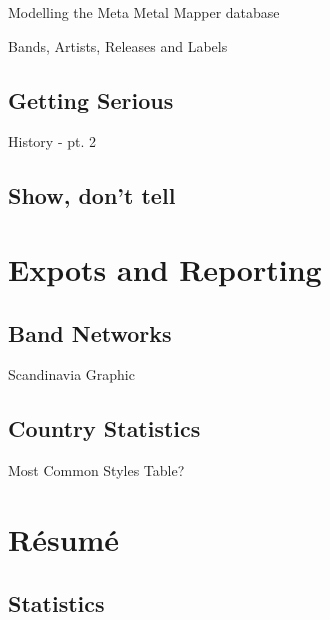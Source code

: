 \documentclass{beamer}
\begin{document}
    \begin{frame}{Modelling the Meta Metal Mapper database}
    
      Bands, Artists, Releases and Labels
    
    \end{frame}

  \subsection{Getting Serious}
  
    \begin{frame}{History - pt. 2}
    
    
    \end{frame}

  \subsection{Show, don't tell}


\section{Expots and Reporting}

  \subsection{Band Networks}

    \begin{frame}{Scandinavia}
      Graphic
    \end{frame}

  \subsection{Country Statistics}

    \begin{frame}{Most Common Styles}
      Table?
    \end{frame}

\section{Résumé}

  \subsection{Statistics}
\end{document}
